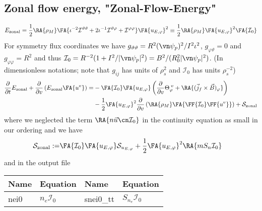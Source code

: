 

\subsection{Zonal flow energy, "Zonal-Flow-Energy"}

\begin{align}
    E_\mathrm{zonal} = \frac{1}{2}\RA{\rho_M}\FA{ \iota^{-2}\mathcal I^{\vartheta\vartheta} + 2\iota^{-1}\mathcal I^{\vartheta\varphi} + \mathcal I^{\varphi\varphi}} \FA{u_{E,\varphi}}^2
    \equiv \frac{1}{2} \RA{\rho_M} \FA{u_{E,\varphi}}^2  \FA{\mathcal I_0}
    \label{eq:zonal_energy}
\end{align}
For symmetry flux coordinates we have $g_{\vartheta\vartheta} = R^2 (\vn\psi_p)^2/I^2\iota^2$, $g_{\varphi\vartheta} =0$ and $g_{\varphi\varphi}=R^2$ and thus $\mathcal I_0 = R^{-2}( 1 + I^2/|\vn\psi_p|^2)= B^2 / (R_0^2|\vn\psi_p|^2)$. (In dimensionless notations; note that $g_{ij}$ has units of $\rho_s^2$ and $\mathcal I_0$ has units $\rho_s^{-2}$)
\begin{align}\label{eq:perp_kinetic}
      \frac{\partial}{\partial t}E_{\mathrm{zonal}} +\frac{\partial}{\partial v } \left(E_{\mathrm{zonal}}\FA{u^v} \right)
  =&-\FA{\mathcal I_0}\FA{u_{E,\varphi}}\left(\frac{\partial }{\partial v}  \Theta_{\varphi}^{\; v} + \RA{(\vec j_f\times\vec B)_\varphi}\right)
  \nonumber\\
    &-\frac{1}{2}\FA{u_{E,\varphi}}^2\frac{\partial}{\partial v}\left(\RA{\rho_M}\FA{\FF{\mathcal I_0}\FF{u^v}}\right)
     + \mathcal S_{\mathrm{zonal}}
\end{align}
where we neglected the term $\RA{n\vec u\cn \mathcal I_0}$ in the continuity equation as small in our ordering
 and we have
 \begin{align}
 \mathcal S_{\mathrm{zonal}} :=& \FA{\mathcal I_0} \FA{u_{E,\varphi}} \mathcal S_{u_{E,\varphi}} + \frac{1}{2}\FA{u_{E,\varphi}}^2  \RA{mS_n\mathcal I_0}
 \label{eq:zonal_source}
 \end{align}
 and in the output file
\begin{longtable}{llll}
\toprule
\rowcolor{gray!50}\textbf{Name} &  \textbf{Equation} &
\textbf{Name} &  \textbf{Equation}\\
\midrule
    nei0 &$n_e \mathcal I_0$ &
    snei0\_tt & $S_{n_e } \mathcal I_0$ \\
\bottomrule
\end{longtable}

